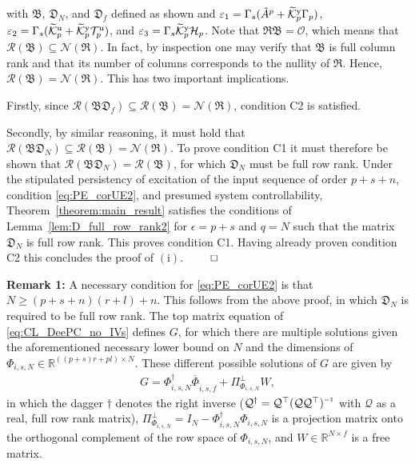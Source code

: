 with $\mathfrak{B}$, $\mathfrak{D}_N$, and $\mathfrak{D}_f$ defined as shown and $\varepsilon_1=\Gamma_s(\tilde{A}^p+\widetilde{\mathcal{K}}_{p}^{\mathrm{{y}}}\Gamma_p)$, $\varepsilon_2=\Gamma_s(\widetilde{\mathcal{K}}_{p}^{\mathrm{{u}}}+\widetilde{\mathcal{K}}_{p}^{\mathrm{{y}}}\mathcal{T}_p^\mathrm{u})$, and $\varepsilon_3=\Gamma_s\widetilde{\mathcal{K}}_{p}^{\mathrm{{y}}}\mathcal{H}_p$. Note that $\mathfrak{RB}=\mathcal{O}$, which means that $\mathcal{R}(\mathfrak{B})\subseteq\mathcal{N}(\mathfrak{R})$. In fact, by inspection one may verify that $\mathfrak{B}$ is full column rank and that its number of columns corresponds to the nullity of $\mathfrak{R}$. Hence, $\mathcal{R}(\mathfrak{B})=\mathcal{N}(\mathfrak{R})$. This has two important implications.

Firstly, since ${\mathcal{R}(\mathfrak{BD}_f)\subseteq\mathcal{R}(\mathfrak{B})=\mathcal{N}(\mathfrak{R})}$, condition C2 is satisfied.

Secondly, by similar reasoning, it must hold that ${\mathcal{R}(\mathfrak{BD}_N)\subseteq\mathcal{R}(\mathfrak{B})=\mathcal{N}(\mathfrak{R})}$. To prove condition C1 it must therefore be shown that $\mathcal{R}(\mathfrak{BD}_N)=\mathcal{R}(\mathfrak{B})$, for which $\mathfrak{D}_N$ must be full row rank. Under the stipulated persistency of excitation of the input sequence of order $p+s+n$, condition \eqref{eq:PE_corUE2}, and presumed system controllability, Theorem~\ref{theorem:main_result} satisfies the conditions of Lemma~\ref{lem:D_full_row_rank2} for $\epsilon=p+s$ and $q=N$ such that the matrix $\mathfrak{D}_N$ is full row rank. This proves condition C1. Having already proven condition C2 this concludes the proof of $\mathrm{(i)}$. $\hfill\qed$

\noindent\textbf{Remark 1:} A necessary condition for \eqref{eq:PE_corUE2} is that ${N\geq(p+s+n)(r+l)+n}$. This follows from the above proof, in which $\mathfrak{D}_N$ is required to be full row rank. The top matrix equation of \eqref{eq:CL_DeePC_no_IVs} defines $G$, for which there are multiple solutions given the aforementioned necessary lower bound on $N$ and the dimensions of $\Phi_{i,s,N}\in\mathbb{R}^{((p+s)r+pl)\times N}$. These different possible solutions of $G$ are given by
\begin{align}%
    G = \Phi_{i,s,N}^\dagger\overline{\Phi}_{\hat{i},s,f} + \Pi_{\Phi_{i,s,N}}^\bot W,
\end{align}
in which the dagger $\dagger$ denotes the right inverse ($\mathcal{Q}^\dagger=\mathcal{Q}^\top(\mathcal{Q}\mathcal{Q}^\top)\inv$ with $\mathcal{Q}$ as a real, full row rank matrix), $\Pi_{\Phi_{i,s,N}}^\bot=I_N-\Phi_{i,s,N}^\dagger\Phi_{i,s,N}$ is a projection matrix onto the orthogonal complement of the row space of $\Phi_{i,s,N}$, %
and $W\in\mathbb{R}^{N\times f}$ is a free matrix.

